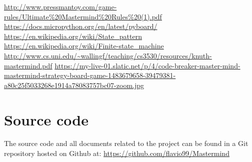 \documentclass[a4paper, 11pt]{article}
\begin{document}
\begin{thebibliography}{9}
    \setlength\itemsep{0pt}
        \url{http://www.pressmantoy.com/game-rules/Ultimate%20Mastermind%20Rules%20(1).pdf}
        \url{https://docs.micropython.org/en/latest/pyboard/}
        \url{https://en.wikipedia.org/wiki/State_pattern}
        \url{https://en.wikipedia.org/wiki/Finite-state_machine}
        \url{http://www.cs.uni.edu/~wallingf/teaching/cs3530/resources/knuth-mastermind.pdf}
        \url{https://my-live-01.slatic.net/p/4/code-breaker-master-mind-mastermind-strategy-board-game-1483679658-39479381-a80c25f5033268e1914a78083757bc07-zoom.jpg}
\end{thebibliography}


\section*{Source code}
The source code and all documents related to the project can be found in
a Git repository hosted on Github at:
\url{https://github.com/flavio99/Mastermind}
\end{document}
